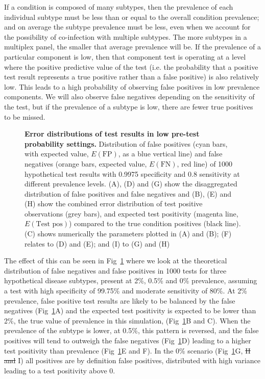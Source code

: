 \documentclass[10pt,letterpaper]{article}
\providecommand{\DIFaddtex}[1]{{\protect\color{blue}\uwave{#1}}} %
\providecommand{\DIFdeltex}[1]{{\protect\color{red}\sout{#1}}}                      %
\providecommand{\DIFaddbegin}{} %
\providecommand{\DIFaddend}{} %
\providecommand{\DIFdelbegin}{} %
\providecommand{\DIFdelend}{} %
\providecommand{\DIFadd}[1]{\texorpdfstring{\DIFaddtex{#1}}{#1}} %
\providecommand{\DIFdel}[1]{\texorpdfstring{\DIFdeltex{#1}}{}} %
\newcommand{\DIFscaledelfig}{0.5}
\newlength{\DIFdelgraphicswidth} %
\newlength{\DIFdelgraphicsheight} %
\newcommand{\DIFaddincludegraphics}[2][]{{\color{blue}\fbox{\DIFOincludegraphics[#1]{#2}}}} %
\newcommand{\DIFdelincludegraphics}[2][]{%
\sbox{\DIFdelgraphicsbox}{\DIFOincludegraphics[#1]{#2}}%
\settoboxwidth{\DIFdelgraphicswidth}{\DIFdelgraphicsbox} %
\settoboxtotalheight{\DIFdelgraphicsheight}{\DIFdelgraphicsbox} %
\scalebox{\DIFscaledelfig}{%
\parbox[b]{\DIFdelgraphicswidth}{\usebox{\DIFdelgraphicsbox}\\[-\baselineskip] \rule{\DIFdelgraphicswidth}{0em}}\llap{\resizebox{\DIFdelgraphicswidth}{\DIFdelgraphicsheight}{%
\setlength{\unitlength}{\DIFdelgraphicswidth}%
\begin{picture}(1,1)%
\thicklines\linethickness{2pt} %
{\color[rgb]{1,0,0}\put(0,0){\framebox(1,1){}}}%
{\color[rgb]{1,0,0}\put(0,0){\line( 1,1){1}}}%
{\color[rgb]{1,0,0}\put(0,1){\line(1,-1){1}}}%
\end{picture}%
}\hspace*{3pt}}} %
} %
\DeclareRobustCommand{\DIFaddbegin}{\DIFOaddbegin \let\includegraphics\DIFaddincludegraphics} %
\DeclareRobustCommand{\DIFaddend}{\DIFOaddend \let\includegraphics\DIFOincludegraphics} %
\DeclareRobustCommand{\DIFdelbegin}{\DIFOdelbegin \let\includegraphics\DIFdelincludegraphics} %
\DeclareRobustCommand{\DIFdelend}{\DIFOaddend \let\includegraphics\DIFOincludegraphics} %
\begin{document}
If a condition is composed of many subtypes, then the prevalence of each individual subtype must be less than or equal to the overall condition prevalence; and on average the subtype prevalence must be less, even when we account for the possibility of co-infection with multiple subtypes. The more subtypes in a multiplex panel, the smaller that average prevalence will be. If the prevalence of a particular component is low, then that component test is operating at a level where the positive predictive value of the test (i.e. the probability that a positive test result represents a true positive rather than a false positive) is also relatively low. This leads to a high probability of observing false positives in low prevalence components. We will also observe false negatives depending on the sensitivity of the test, but if the prevalence of a subtype is low, there are fewer true positives to be missed.

\begin{figure}[hb!]
\caption{{\bf Error distributions of test results in low pre-test probability settings.}
 Distribution of false positives (cyan bars, with expected value, \(E(\textrm{FP})\), as a blue vertical line) and false negatives (orange bars, expected value, \(E(\textrm{FN})\), red line) of 1000 hypothetical test results with 0.9975 specificity and 0.8 sensitivity at different prevalence levels. (A), (D) and (G) show the disaggregated distribution of false positives and false negatives and (B), (E) and (H) show the combined error distribution of test positive observations (grey bars), and expected test positivity (magenta line, \(E(\textrm{Test pos})\)) compared to the true condition positives (black line). (C) shows numerically the parameters plotted in (A) and (B); (F) relates to (D) and (E); and (I) to (G) and (H)}
\label{fig2}
\end{figure}

The effect of this can be seen in Fig~\ref{fig2} where we look at the theoretical distribution of false negatives and false positives in 1000 tests for three hypothetical disease subtypes, present at 2\%, 0.5\% and 0\% prevalence, assuming a test with high specificity of 99.75\% and moderate sensitivity of 80\%. At 2\% prevalence, false positive test results are likely to be balanced by the false negatives (Fig~\ref{fig2}A) and the expected test positivity is expected to be lower than 2\%, the true value of prevalence in this simulation, (Fig~\ref{fig2}B and \DIFaddbegin \DIFadd{Fig~\ref{fig2}}\DIFaddend C). When the prevalence of the subtype is lower, at 0.5\%, this pattern is reversed, and the false positives will tend to outweigh the false negatives (Fig~\ref{fig2}D) leading to a higher test positivity than prevalence (Fig~\ref{fig2}E and \DIFaddbegin \DIFadd{\ref{fig2}}\DIFaddend F). In the 0\% scenario (Fig~\ref{fig2}G, \DIFdelbegin \DIFdel{H and }\DIFdelend \DIFaddbegin \DIFadd{\ref{fig2}H and \ref{fig2}}\DIFaddend I) all positives are by definition false positives,  distributed with high variance leading to a test positivity above 0.
\end{document}
